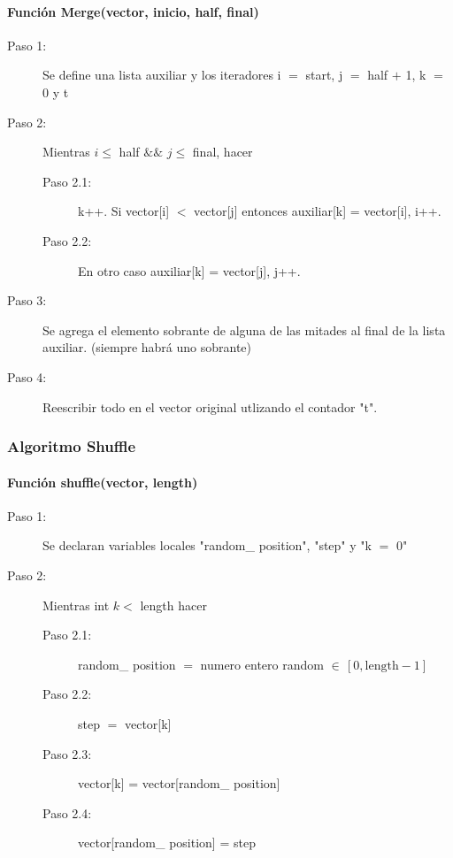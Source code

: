 \paragraph{Función Merge(vector, inicio, half, final)}
\begin{description}
	\item[Paso 1: ] Se define una lista auxiliar y los iteradores i $=$ start, j $=$ half $+$ 1, k $=$ $0$ y t
	\item[Paso 2: ] Mientras $i \leq$ half $\& \&$ $j\leq$ final, hacer
	\begin{description}
		\item[Paso 2.1: ] k++. Si vector[i] $<$ vector[j] entonces auxiliar[k] = vector[i], i++.
		\item[Paso 2.2: ] En otro caso auxiliar[k] = vector[j], j++.
	\end{description}
	\item[Paso 3: ] Se agrega el elemento sobrante de alguna de las mitades al final de la lista auxiliar. (siempre habrá uno sobrante)
	\item[Paso 4: ] Reescribir todo en el vector original utlizando el contador "t".
\end{description}

\subsubsection{Algoritmo Shuffle}
\paragraph{Función shuffle(vector, length)}
\begin{description}
	\item[Paso 1: ] Se declaran variables locales "random\_ position", "step" y "k $=$ 0"
	\item[Paso 2: ] Mientras int $k <$ length hacer
		\begin{description}
			\item[Paso 2.1: ] random\_ position $=$ numero entero random $\in \, [0,\text{length} - 1]$
			\item[Paso 2.2: ] step $=$ vector[k]
			\item[Paso 2.3: ] vector[k] = vector[random\_ position]
			\item[Paso 2.4: ] vector[random\_ position] = step
		\end{description}
\end{description}

